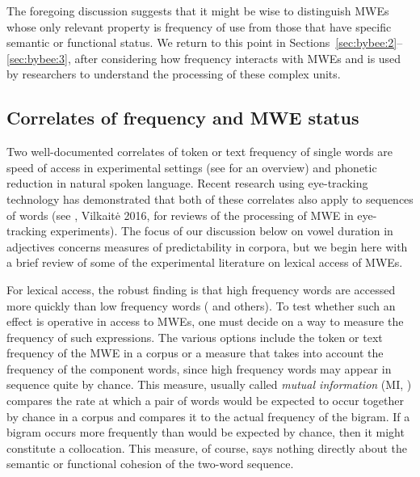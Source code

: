 \documentclass[output=paper]{langscibook}
\begin{document}
The foregoing discussion suggests that it might be wise to distinguish MWEs whose only relevant property is frequency of use from those that have specific semantic or functional status. We return to this point in Sections~\ref{sec:bybee:2}--\ref{sec:bybee:3}, after considering how frequency interacts with MWEs and is used by researchers to understand the processing of these complex units. 

\subsection{Correlates of frequency and MWE status}\label{sec:bybee:1.2}

Two well-documented correlates of token or text frequency of single words are speed of access in experimental settings (see \citealt{Ellis2002} for an overview) and phonetic reduction in natural spoken language. Recent research using eye-tracking technology has demonstrated that both of these correlates also apply to sequences of words (see \citealt{CarrolConklin2014}, Vilkait\.e 2016, for reviews of the processing of MWE in eye-tracking experiments). The focus of our discussion below on vowel duration in adjectives concerns measures of predictability in corpora, but we begin here with a brief review of some of the experimental literature on lexical access of MWEs.

For lexical access, the robust finding is that high frequency words are accessed more quickly than low frequency words (\citealt{ScarboroughEtAl1977,GardnerEtAl1987} and others). To test whether such an effect is operative in access to MWEs, one must decide on a way to measure the frequency of such expressions. The various options include the token or text frequency of the MWE in a corpus or a measure that takes into account the frequency of the component words, since high frequency words may appear in sequence quite by chance. This measure, usually called \textit{mutual information} (MI, \citealt{ChurchHanks1990}) compares the rate at which a pair of words would be expected to occur together by chance in a corpus and compares it to the actual frequency of the bigram. If a bigram occurs more frequently than would be expected by chance, then it might constitute a collocation. This measure, of course, says nothing directly about the semantic or functional cohesion of the two-word sequence.  
\end{document}
